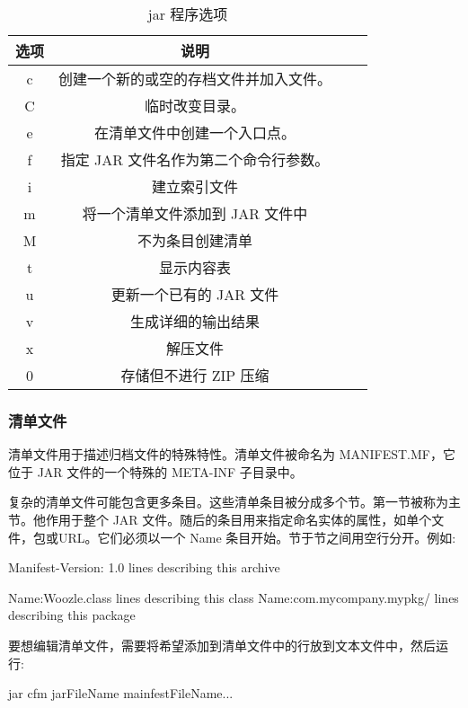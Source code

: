 \begin{table}[H]
    \centering
    \caption{jar 程序选项}
    \label{table:jar 程序选项}
    \setlength{\tabcolsep}{10mm}
    \begin{tabular}{c|ccc}
        \toprule
        \textbf{选项} & \textbf{说明} \\
        \midrule
        c & 创建一个新的或空的存档文件并加入文件。 \\
        C & 临时改变目录。 \\
        e & 在清单文件中创建一个入口点。 \\
        f & 指定 JAR 文件名作为第二个命令行参数。 \\
        i & 建立索引文件 \\
        m & 将一个清单文件添加到 JAR 文件中 \\
        M & 不为条目创建清单 \\
        t & 显示内容表 \\
        u & 更新一个已有的 JAR 文件 \\
        v & 生成详细的输出结果 \\
        x & 解压文件 \\
        0 & 存储但不进行 ZIP 压缩 \\
        \bottomrule
    \end{tabular}
\end{table}

\subsubsection{清单文件}

清单文件用于描述归档文件的特殊特性。清单文件被命名为 MANIFEST.MF，它位于 JAR 文件的一个特殊的 META-INF 子目录中。

复杂的清单文件可能包含更多条目。这些清单条目被分成多个节。第一节被称为主节。他作用于整个 JAR 文件。随后的条目用来指定命名实体的属性，如单个文件，包或URL。它们必须以一个 Name 条目开始。节于节之间用空行分开。例如:

\begin{Java}
Manifest-Version: 1.0
lines describing this archive

Name:Woozle.class
lines describing this class
Name:com.mycompany.mypkg/
lines describing this package

\end{Java}

要想编辑清单文件，需要将希望添加到清单文件中的行放到文本文件中，然后运行:
\begin{Java}
jar cfm jarFileName mainfestFileName...
\end{Java}

